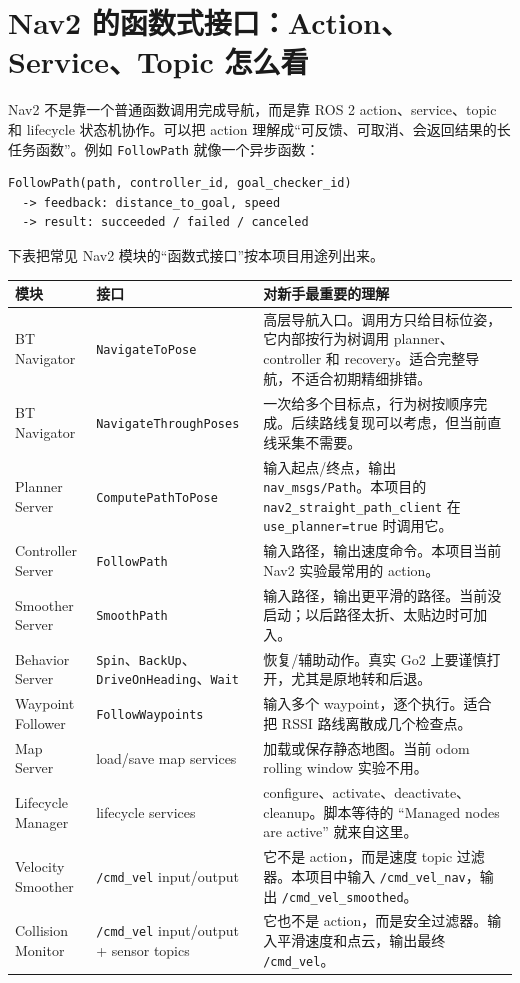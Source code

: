 \documentclass[UTF8,11pt,a4paper,openany]{ctexrep}
\newcommand{\code}[1]{\nolinkurl{#1}}
\newcommand{\topic}[1]{\nolinkurl{#1}}
\newcommand{\param}[1]{\nolinkurl{#1}}
\newcommand{\pkg}[1]{\nolinkurl{#1}}
\newcommand{\actionname}[1]{\nolinkurl{#1}}
\begin{document}
\section{Nav2 的函数式接口：Action、Service、Topic 怎么看}

Nav2 不是靠一个普通函数调用完成导航，而是靠 ROS 2 action、service、topic 和 lifecycle 状态机协作。可以把 action 理解成“可反馈、可取消、会返回结果的长任务函数”。例如 \actionname{FollowPath} 就像一个异步函数：

\begin{lstlisting}
FollowPath(path, controller_id, goal_checker_id)
  -> feedback: distance_to_goal, speed
  -> result: succeeded / failed / canceled
\end{lstlisting}

下表把常见 Nav2 模块的“函数式接口”按本项目用途列出来。

\begin{footnotesize}
\begin{longtable}{L{0.17\textwidth}L{0.23\textwidth}L{0.50\textwidth}}
\toprule
模块 & 接口 & 对新手最重要的理解 \\
\midrule
BT Navigator & \actionname{NavigateToPose} & 高层导航入口。调用方只给目标位姿，它内部按行为树调用 planner、controller 和 recovery。适合完整导航，不适合初期精细排错。 \\
BT Navigator & \actionname{NavigateThroughPoses} & 一次给多个目标点，行为树按顺序完成。后续路线复现可以考虑，但当前直线采集不需要。 \\
Planner Server & \actionname{ComputePathToPose} & 输入起点/终点，输出 \code{nav_msgs/Path}。本项目的 \pkg{nav2_straight_path_client} 在 \param{use_planner=true} 时调用它。 \\
Controller Server & \actionname{FollowPath} & 输入路径，输出速度命令。本项目当前 Nav2 实验最常用的 action。 \\
Smoother Server & \actionname{SmoothPath} & 输入路径，输出更平滑的路径。当前没启动；以后路径太折、太贴边时可加入。 \\
Behavior Server & \actionname{Spin}、\actionname{BackUp}、\actionname{DriveOnHeading}、\actionname{Wait} & 恢复/辅助动作。真实 Go2 上要谨慎打开，尤其是原地转和后退。 \\
Waypoint Follower & \actionname{FollowWaypoints} & 输入多个 waypoint，逐个执行。适合把 RSSI 路线离散成几个检查点。 \\
Map Server & load/save map services & 加载或保存静态地图。当前 odom rolling window 实验不用。 \\
Lifecycle Manager & lifecycle services & configure、activate、deactivate、cleanup。脚本等待的 ``Managed nodes are active'' 就来自这里。 \\
Velocity Smoother & \topic{/cmd_vel} input/output & 它不是 action，而是速度 topic 过滤器。本项目中输入 \topic{/cmd_vel_nav}，输出 \topic{/cmd_vel_smoothed}。 \\
Collision Monitor & \topic{/cmd_vel} input/output + sensor topics & 它也不是 action，而是安全过滤器。输入平滑速度和点云，输出最终 \topic{/cmd_vel}。 \\
\bottomrule
\end{longtable}
\end{footnotesize}
\end{document}
